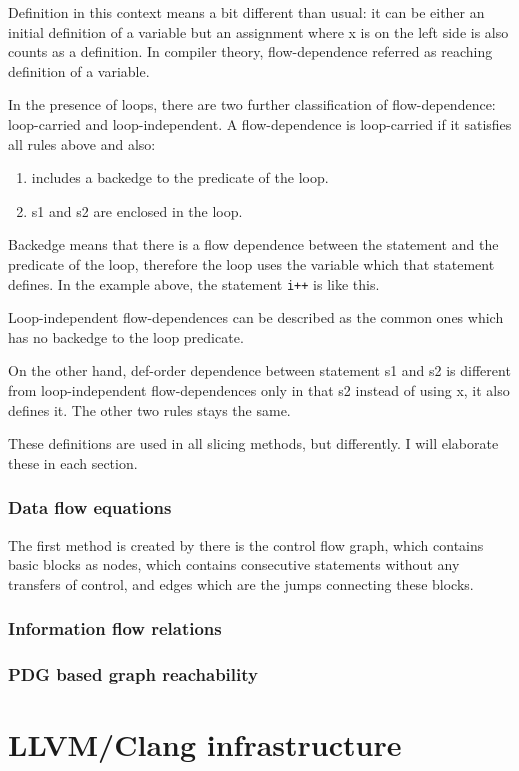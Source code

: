 \documentclass[oneside,12pt,a4paper]{book}
\begin{document}
Definition in this context means a bit different than usual: it can be either an initial definition of a variable but an assignment where x is on the left side is also counts as a definition. In compiler theory, flow-dependence referred as reaching definition of a variable.

In the presence of loops, there are two further classification of flow-dependence: loop-carried and loop-independent. A flow-dependence is loop-carried if it satisfies all rules above and also:
\begin{enumerate}
  \item includes a backedge to the predicate of the loop.
  \item s1 and s2 are enclosed in the loop.
\end{enumerate}

Backedge means that there is a flow dependence between the statement and the predicate of the loop, therefore the loop uses the variable which that statement defines. In the example above, the statement \texttt{i++} is like this.

Loop-independent flow-dependences can be described as the common ones which has no backedge to the loop predicate. 

On the other hand, def-order dependence between statement s1 and s2 is different from loop-independent flow-dependences only in that s2 instead of using x, it also defines it. The other two rules stays the same. 

These definitions are used in all slicing methods, but differently. I will elaborate these in each section.

\subsection{Data flow equations}
The first method is created by there is the control flow graph, which contains basic blocks as nodes, which contains consecutive statements without any transfers of control, and edges which are the jumps connecting these blocks. 


\subsection{Information flow relations}
\subsection{PDG based graph reachability}


\chapter{LLVM/Clang infrastructure}
\end{document}
